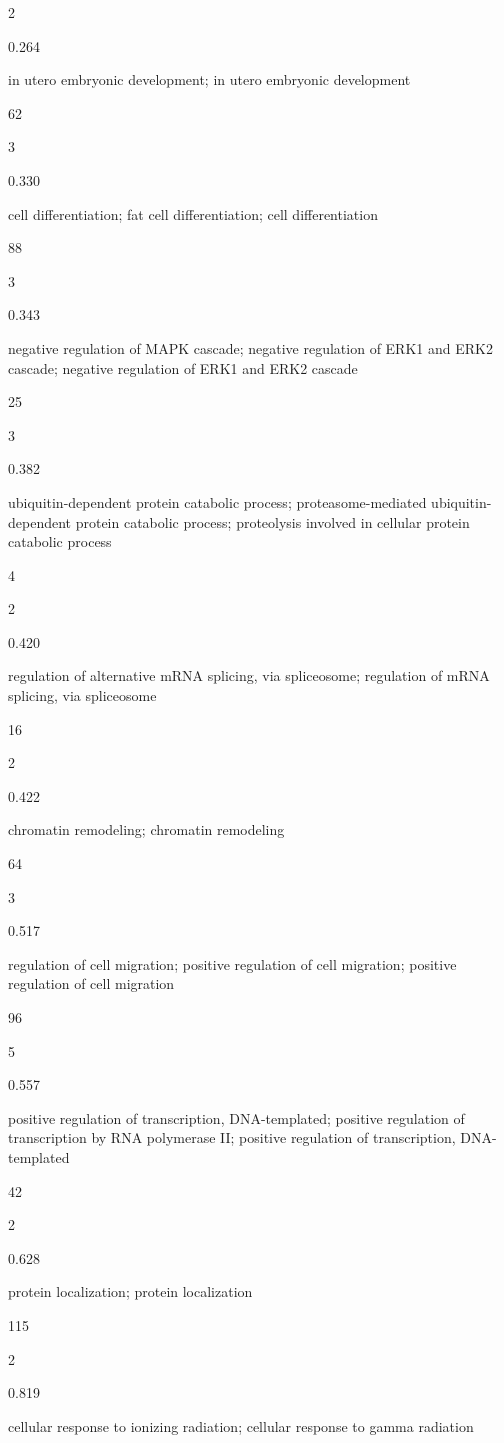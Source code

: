 \documentclass[
  letterpaper,
  DIV=11,
  numbers=noendperiod,
  openany,
  oneside]{scrreprt}
\begin{document}
2

0.264

in utero embryonic development; in utero embryonic development

62

3

0.330

cell differentiation; fat cell differentiation; cell differentiation

88

3

0.343

negative regulation of MAPK cascade; negative regulation of ERK1 and
ERK2 cascade; negative regulation of ERK1 and ERK2 cascade

25

3

0.382

ubiquitin-dependent protein catabolic process; proteasome-mediated
ubiquitin-dependent protein catabolic process; proteolysis involved in
cellular protein catabolic process

4

2

0.420

regulation of alternative mRNA splicing, via spliceosome; regulation of
mRNA splicing, via spliceosome

16

2

0.422

chromatin remodeling; chromatin remodeling

64

3

0.517

regulation of cell migration; positive regulation of cell migration;
positive regulation of cell migration

96

5

0.557

positive regulation of transcription, DNA-templated; positive regulation
of transcription by RNA polymerase II; positive regulation of
transcription, DNA-templated

42

2

0.628

protein localization; protein localization

115

2

0.819

cellular response to ionizing radiation; cellular response to gamma
radiation
\end{document}
